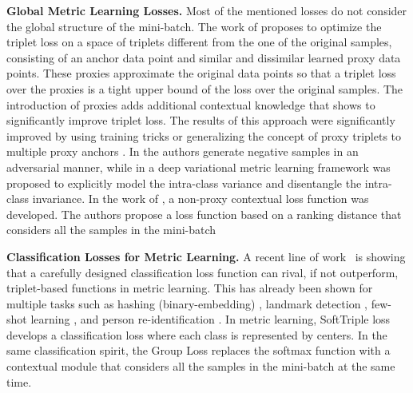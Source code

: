 \documentclass{article}
\begin{document}
\textbf{Global Metric Learning Losses.} Most of the mentioned losses do not consider the global structure of the mini-batch. 
The work of \cite{DBLP:conf/iccv/Movshovitz-Attias17} proposes to optimize the triplet loss on a space of triplets different from the one of the original samples, consisting of an anchor data point and similar and dissimilar learned proxy data points. 
These proxies approximate the original data points so that a triplet loss over the proxies is a tight upper bound of the loss over the original samples. 
The introduction of proxies adds additional contextual knowledge that shows to significantly improve triplet loss. The results of this approach were significantly improved by using training tricks \cite{DBLP:journals/corr/abs-2004-01113} or generalizing the concept of proxy triplets to multiple proxy anchors \cite{DBLP:conf/cvpr/KimKCK20, DBLP:journals/corr/abs-2010-13636}. 
In \cite{DBLP:conf/cvpr/DuanZLL018} the authors generate negative samples in an adversarial manner, while in \cite{DBLP:conf/eccv/LinDDLZ18} a deep variational metric learning framework was proposed to explicitly model the intra-class variance and disentangle the intra-class invariance.
In the work of \cite{DBLP:conf/cvpr/WangHKHGR19}, a non-proxy contextual loss function was developed. The authors propose a loss function based on a ranking distance that considers all the samples in the mini-batch 


\textbf{Classification Losses for Metric Learning.} A recent line of work~\cite{DBLP:journals/corr/abs-1811-12649, DBLP:conf/aaai/ZhengJSZWH19} is showing that a carefully designed classification loss function can rival, if not outperform, triplet-based functions in metric learning. This has already been shown for multiple tasks such as hashing (binary-embedding) \cite{DBLP:conf/cvpr/0003CBS18}, landmark detection \cite{DBLP:conf/cvpr/0003LS18, DBLP:journals/corr/abs-1906-07589}, few-shot learning \cite{DBLP:conf/cvpr/Cakir0XKS19}, and person re-identification \cite{DBLP:journals/corr/abs-1904-11397,DBLP:conf/cvpr/ZhaoXC19}. In metric learning, SoftTriple loss \cite{DBLP:journals/corr/abs-1909-05235} develops a classification loss where each class is represented by  centers. In the same classification spirit, the Group Loss \cite{DBLP:conf/eccv/GrLoss} replaces the softmax function with a contextual module that considers all the samples in the mini-batch at the same time.  
\end{document}
